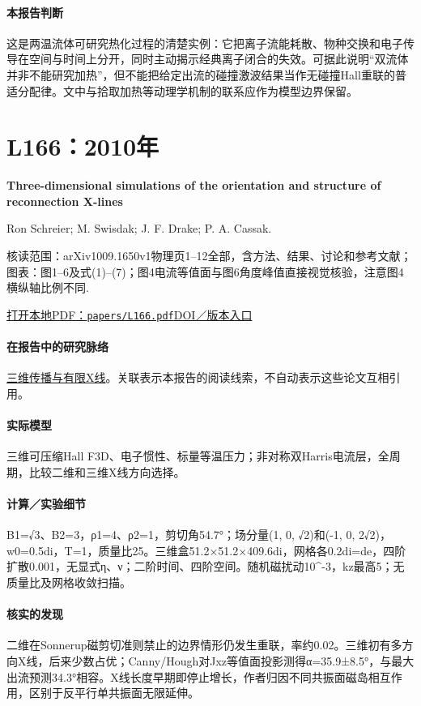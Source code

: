 \documentclass[UTF8,a4paper,11pt,openany,fontset=fandol]{ctexbook}
\begin{document}
\paragraph{本报告判断}这是两温流体可研究热化过程的清楚实例：它把离子流能耗散、物种交换和电子传导在空间与时间上分开，同时主动揭示经典离子闭合的失效。可据此说明“双流体并非不能研究加热”，但不能把给定出流的碰撞激波结果当作无碰撞Hall重联的普适分配律。文中与拾取加热等动理学机制的联系应作为模型边界保留。

\section{L166：2010年}\label{paper:L166}

\textbf{Three-dimensional simulations of the orientation and structure of reconnection X-lines}\citep{L166}\

Ron Schreier;  M. Swisdak;  J. F. Drake;  P. A. Cassak.

\textsf{核读范围：}arXiv1009.1650v1物理页1–12全部，含方法、结果、讨论和参考文献；\textsf{图表：}图1–6及式(1)–(7)；图4电流等值面与图6角度峰值直接视觉核验，注意图4横纵轴比例不同.

\href{run:../papers/L166.pdf}{打开本地PDF：\texttt{papers/L166.pdf}}\quad\href{https://doi.org/10.1063/1.3494218}{DOI／版本入口}

\paragraph{在报告中的研究脉络}\hyperref[story:three]{三维传播与有限X线}。关联表示本报告的阅读线索，不自动表示这些论文互相引用。

\paragraph{实际模型}三维可压缩Hall F3D、电子惯性、标量等温压力；非对称双Harris电流层，全周期，比较二维和三维X线方向选择。

\paragraph{计算／实验细节}B1=√3、B2=3，ρ1=4、ρ2=1，剪切角54.7°；场分量(1, 0, √2)和(-1, 0, 2√2)，w0=0.5di，T=1，质量比25。三维盒51.2×51.2×409.6di，网格各0.2di=de，四阶扩散0.001，无显式η、ν；二阶时间、四阶空间。随机磁扰动10\textasciicircum{}-3，kz最高5；无质量比及网格收敛扫描。

\paragraph{核实的发现}二维在Sonnerup磁剪切准则禁止的边界情形仍发生重联，率约0.02。三维初有多方向X线，后来少数占优；Canny/Hough对Jxz等值面投影测得α=35.9±8.5°，与最大出流预测34.3°相容。X线长度早期即停止增长，作者归因不同共振面磁岛相互作用，区别于反平行单共振面无限延伸。
\end{document}
